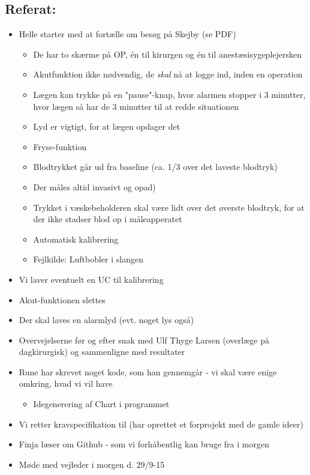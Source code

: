 \documentclass[a4paper,11pt,oneside]{memoir}
\begin{document}
\subsection{Referat:}
\begin{itemize}
\item Helle starter med at fortælle om besøg på Skejby (se PDF)
\begin{itemize}
\item De har to skærme på OP, én til kirurgen og én til anestæsisygeplejersken
\item Akutfunktion ikke nødvendig, de \textit{skal} nå at logge ind, inden en operation
\item Lægen kan trykke på en "pause"-knap, hvor alarmen stopper i 3 minutter, hvor lægen så har de 3 minutter til at redde situationen
\item Lyd er vigtigt, for at lægen opdager det
\item Fryse-funktion
\item Blodtrykket går ud fra baseline (ca. 1/3 over det laveste blodtryk)
\item Der måles altid invasivt og opad)
\item Trykket i væskebeholderen skal være lidt over det øverste blodtryk, for at der ikke stadser blod op i måleapperatet 
\item Automatisk kalibrering 
\item Fejlkilde: Luftbobler i slangen
\end{itemize}
\item Vi laver eventuelt en UC til kalibrering 
\item Akut-funktionen slettes 
\item Der skal laves en alarmlyd (evt. noget lys også)
\item Overvejelserne før og efter snak med Ulf Thyge Larsen (overlæge på dagkirurgisk) og sammenligne med resultater 
\item Rune har skrevet noget kode, som han gennemgår - vi skal være enige omkring, hvad vi vil have 
\begin{itemize}
\item Idegenerering af Chart i programmet
\end{itemize}
\item Vi retter kravspecifikation til (har oprettet et forprojekt med de gamle ideer)
\item Finja læser om Github - som vi forhåbentlig kan bruge fra i morgen
\item Møde med vejleder i morgen d. 29/9-15
\end{itemize}
\end{document}
